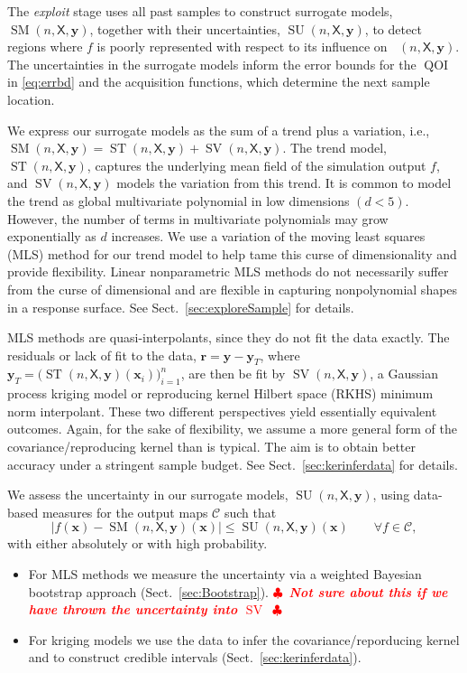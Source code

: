\documentclass[11pt]{NSFamsart}
\DeclareMathOperator{\QOI}{QOI} %
\DeclareMathOperator{\APP}{\widehat{\QOI}}
\DeclareMathOperator{\SURR}{SM} %
\DeclareMathOperator{\STREND}{ST} %
\DeclareMathOperator{\SVAR}{SV} %
\newcommand{\MLS}{\textrm{MLS}\xspace} %
\DeclareMathOperator{\SURRERR}{SU}
\newcommand{\mX}{\mathsf{X}}
\newcommand{\bx}{{\boldsymbol{x}}}
\newcommand{\br}{{\boldsymbol{r}}}
\newcommand{\by}{{\boldsymbol{y}}}
\newcommand{\calc}{{\mathcal{C}}}
\def\abs#1{\ensuremath{\left \lvert #1 \right \rvert}}
\newif\ifnotesw \noteswtrue
\newcommand{\notes}[1]{\ifnotesw \textcolor{red}{  $\clubsuit$\ {\sf \bf \it  #1}\ $\clubsuit$  }\fi}
\begin{document}
The \emph{exploit} stage uses all past samples to construct surrogate models, $\SURR(n,\mX,\by)$, together with their uncertainties, $\SURRERR(n,\mX,\by)$, to detect regions where $f$ is poorly represented with respect to its influence on $\APP(n,\mX,\by)$.  The uncertainties in the surrogate models inform the error bounds for the $\QOI$ in \eqref{eq:errbd} and the acquisition functions, which determine the next sample location.

We express our surrogate models as the sum of a trend plus a variation, i.e., $\SURR(n,\mX,\by) = \STREND(n,\mX,\by) + \SVAR(n,\mX,\by)$. 
The trend model, $\STREND(n,\mX,\by)$, captures the underlying mean field of the simulation output $f$,  and  $\SVAR(n,\mX,\by)$ models the variation from this trend. 
It is common to model the trend as global multivariate polynomial in low dimensions $(d<5)$. 
However, the number of terms in multivariate polynomials may grow exponentially as $d$ increases.  We use  
a variation of the moving least squares (\MLS) method \cite{liumovingpartI1997, limovingpartII1996, salehi2013generalized, mederos2003moving} for our trend model to help tame this curse of dimensionality and provide flexibility.  Linear nonparametric \MLS methods do not necessarily suffer from the curse of dimensional and are flexible in capturing nonpolynomial shapes in a response surface.  
See Sect.\ \ref{sec:exploreSample} for details.  

\MLS methods are quasi-interpolants, since they do not fit the data exactly.  
The residuals or lack of fit to the data, $\br = \by - \by_T$, where $\by_T = \bigl( \STREND(n,\mX,\by)(\bx_i) \bigr)_{i=1}^n$, are then be fit by $\SVAR(n,\mX,\by)$, a Gaussian process kriging model or reproducing kernel Hilbert space (RKHS) minimum norm interpolant.  These two different perspectives yield essentially equivalent outcomes.  Again, for the sake of flexibility, we assume a more general form of the covariance/reproducing kernel than is typical.  The aim is to obtain better accuracy under a stringent sample budget. See Sect.\ \ref{sec:kerinferdata} for details.  

We assess the uncertainty in  our surrogate models, $\SURRERR(n,\mX,\by)$, using data-based measures for the output maps $\calc$ such that 
\begin{equation} \label{eq:surrUncert}
    \abs{f(\bx)-\SURR(n,\mX,\by)(\bx)} \le \SURRERR(n,\mX,\by)(\bx) \qquad \forall f \in \calc,
\end{equation}
with either absolutely or with high probability.
\begin{itemize}
\item For \MLS methods we measure the uncertainty via a weighted Bayesian bootstrap approach (Sect.\ \ref{sec:Bootstrap}). \notes{Not sure about this if we have thrown the uncertainty into $\SVAR$}
\item For kriging models we use the data to infer the   covariance/reporducing kernel and to construct credible intervals (Sect.\ \ref{sec:kerinferdata}).
\end{itemize}
\end{document}
